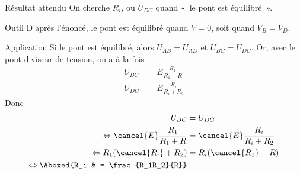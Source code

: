 \documentclass[../main/main.tex]{subfiles}
\begin{document}
\begin{tcbraster}[raster columns=6, raster equal height=rows]
    \begin{tcolorbox}[blankest, raster multicolumn=1, space to=\myspace]
        \begin{tcbraster}[raster columns=1]
            \begin{NCprop}[add to natural height=\myspace]{Résultat attendu}
                On cherche $R_i$, ou $U_{DC}$ quand «~le pont est équilibré~».
            \end{NCprop}
            \begin{NCdemo}{Outil}
                D'après l'énoncé, le pont est équilibré quand $V = 0$, soit
                quand $V_B = V_D$.
            \end{NCdemo}
        \end{tcbraster}
    \end{tcolorbox}
    \begin{NCexem}[raster multicolumn=3]{Application}
        Si le pont est équilibré, alors $U_{AB} = U_{AD}$ et $U_{BC} = U_{DC}$.
        Or, avec le pont diviseur de tension, on a à la fois
        \begin{align*}
            U_{BC} & = E \frac{R_1}{R_1+R}\\
            U_{DC} & = E \frac{R_i}{R_i+R_2}
        \end{align*}
        Donc
        \begin{align*}
            U_{BC} &= U_{DC}\\
            \Leftrightarrow \cancel{E} \frac{R_1}{R_1+R}
                   & = \cancel{E} \frac{R_i}{R_i+R_2}\\
            \Leftrightarrow R_1(\cancel{R_i}+R_2) & = R_i(\cancel{R_1}+R)\\
            \Leftrightarrow \Aboxed{R_i & = \frac{R_1R_2}{R}}
        \end{align*}
    \end{NCexem}
\end{tcbraster}
\end{document}
